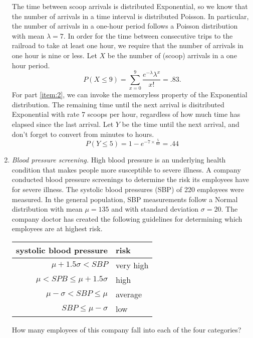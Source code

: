 \begin{enumerate}
\begin{solution}
  \bs The time between scoop arrivals is distributed Exponential, so
  we know that the number of arrivals in a time interval is
  distributed Poisson. In particular, the number of arrivals in a
  one-hour period follows a Poisson distribution with mean
  $\lambda=7$. In order for the time between consecutive trips to the
  railroad to take at least one hour, we require that the number of
  arrivals in one hour is nine or less. Let $X$ be the number of
  (scoop) arrivals in a one hour period.
\[
P(X \leq 9) = \sum_{x=0}^9 \frac{e^{-\lambda}\lambda^x}{x!} = .83.
\]
For part \ref{item:2}, we can invoke the memoryless property of the
Exponential distribution. The remaining time until the next arrival is
disitributed Exponential with rate 7 scoops per hour, regardless of how
much time has elapsed since the last arrival. Let $Y$ be the time
until the next arrival, and don't forget to convert from minutes to
hours.
\[
P(Y \leq 5) = 1 - e^{-7\times \frac{5}{60}} = .44
\]
\end{solution}

\item \emph{Blood pressure screening.} High blood pressure is an
  underlying health condition that makes people more susceptible to
  severe illness. A company conducted blood pressure screenings to
  determine the risk its employees have for severe illness. The
  systolic blood pressures (SBP) of 220 employees were measured.  In
  the general population, SBP measurements follow a Normal distribution
  with mean $\mu=135$ and with standard deviation $\sigma=20$.  The
  company doctor has created the following guidelines for determining
  which employees are at highest risk.

\begin{tabular}{rl}
	systolic blood pressure & risk \\ \hline
	$\mu+1.5\sigma < SBP$ & very high \\
	$\mu < SPB \leq \mu+1.5\sigma$ & high \\
	$\mu-\sigma < SBP \leq \mu$ & average \\
	$SBP \leq \mu-\sigma$ & low
\end{tabular}

How many employees of this company fall into each of the four categories?


\end{enumerate}
